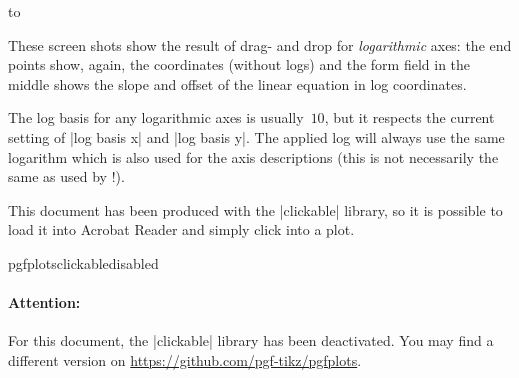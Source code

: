     \noindent
    \hbox to %

\nobreak These screen shots show the result of drag- and drop for
\emph{logarithmic} axes: the end points show, again, the coordinates (without
logs) and the form field in the middle shows the slope and offset of the linear
equation in log coordinates.

The log basis for any logarithmic axes is usually~$10$, but it respects the
current setting of |log basis x| and |log basis y|. The applied log will always
use the same logarithm which is also used for the axis descriptions (this is
not necessarily the same as used by \PGFPlotstable!).

This document has been produced with the |clickable| library, so it is possible
to load it into Acrobat Reader and simply click into a plot.

    \expandafter\ifx\csname pgfplotsclickabledisabled\endcsname\relax
    \else
    \paragraph{Attention:}
    For this document, the |clickable| library has been deactivated. You may
    find a different version on \url{https://github.com/pgf-tikz/pgfplots}.
    \fi

